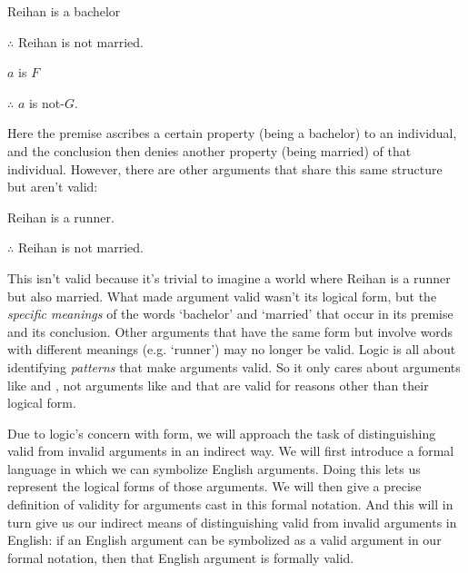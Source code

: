 \begin{multicols}{2}

\begin{earg}
\item[\eref{exarg6}] Reihan is a bachelor
\item[] $\therefore$ Reihan is not married.
\end{earg}

\columnbreak

\begin{earg}
\item[] $a$ is $F$
\item[] $\therefore$ $a$ is not-$G$.
\end{earg}
\end{multicols}
\noindent Here the premise ascribes a certain property (being a bachelor) to an individual, and the conclusion then denies another property (being married) of that individual. However, there are other arguments that share this same structure but aren't valid:
\begin{earg}
\item[] Reihan is a runner.
\item[] $\therefore$ Reihan is not married.
\end{earg}
This isn't valid because it's trivial to imagine a world where Reihan is a runner but also married.  What made argument  valid wasn't its logical form, but the \emph{specific meanings} of the words `bachelor' and `married' that occur in its premise and its conclusion. Other arguments that have the same form but involve words with different meanings (e.g. `runner') may no longer be valid. Logic is all about identifying \emph{patterns} that make arguments valid.  So it only cares about  arguments like  and , not arguments like  and  that are valid for reasons other than their logical form. 




Due to logic's concern with form, we will approach the task of distinguishing valid from invalid arguments in an indirect way. We will first introduce a formal language in which we can symbolize English arguments.  Doing this lets us represent the logical forms of those arguments.  We will then give a precise definition of validity for arguments cast in this formal notation.  And this will in turn give us our indirect means of distinguishing valid from invalid arguments in English: if an English argument can be symbolized as a valid argument in our formal notation, then that English argument is formally valid.

